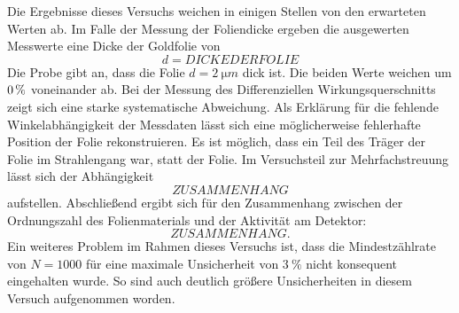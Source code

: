 %
%
Die Ergebnisse dieses Versuchs weichen in einigen Stellen von den erwarteten Werten ab.
Im Falle der Messung der Foliendicke ergeben die ausgewerten Messwerte eine Dicke der Goldfolie von
\begin{equation*}
	d= DICKE DER FOLIE %
\end{equation*}
Die Probe gibt an, dass die Folie $d=\SI{2}{\micro m}$ dick ist.
Die beiden Werte weichen um $\huge{\SI{000000000000000000000000}{\%}}$ voneinander ab.
Bei der Messung des Differenziellen Wirkungsquerschnitts zeigt sich eine starke systematische Abweichung.
Als Erklärung für die fehlende Winkelabhängigkeit der Messdaten lässt sich eine möglicherweise fehlerhafte Position der Folie rekonstruieren.
Es ist möglich, dass ein Teil des Träger der Folie im Strahlengang war, statt der Folie.
Im Versuchsteil zur Mehrfachstreuung lässt sich der Abhängigkeit
\begin{equation*}
	ZUSAMMENHANG
\end{equation*}
aufstellen.
Abschließend ergibt sich für den Zusammenhang zwischen der Ordnungszahl des Folienmaterials und der Aktivität am Detektor:
\begin{equation*}
	ZUSAMMENHANG.
\end{equation*}
Ein weiteres Problem im Rahmen dieses Versuchs ist, dass die Mindestzählrate von $N=1000$ für eine maximale Unsicherheit von $\SI{3}{\%}$ nicht konsequent eingehalten wurde.
So sind auch deutlich größere Unsicherheiten in diesem Versuch aufgenommen worden.
